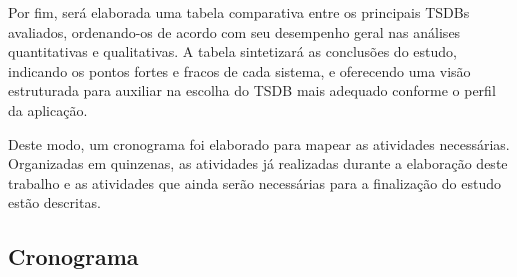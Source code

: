 Por fim, será elaborada uma tabela comparativa entre os principais TSDBs avaliados, ordenando-os de acordo com seu desempenho geral nas análises quantitativas e qualitativas. A tabela sintetizará as conclusões do estudo, indicando os pontos fortes e fracos de cada sistema, e oferecendo uma visão estruturada para auxiliar na escolha do TSDB mais adequado conforme o perfil da aplicação.

Deste modo, um cronograma foi elaborado para mapear as atividades necessárias. Organizadas em quinzenas, as atividades já realizadas durante a elaboração deste trabalho e as atividades que ainda serão necessárias para a finalização do estudo estão descritas.

\begin{landscape}
\section{Cronograma}
\noindent
{}
\end{landscape}
